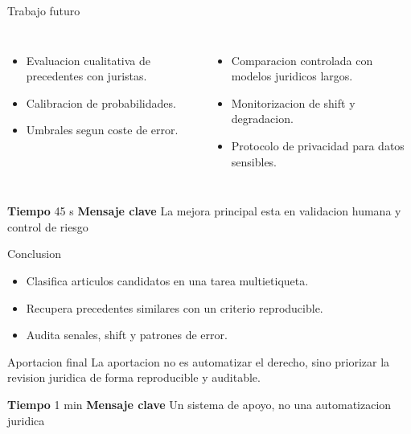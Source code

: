 \documentclass[aspectratio=169,10pt]{beamer}
\newcommand{\slidemeta}[2]{
  \vfill
  {\scriptsize\color{Muted}\textbf{Tiempo} #1 \hfill \textbf{Mensaje clave} #2}
}
\begin{document}
\begin{frame}{Trabajo futuro}
  \begin{columns}[T,onlytextwidth]
    \begin{itemize}
      \item Evaluacion cualitativa de precedentes con juristas.
      \item Calibracion de probabilidades.
      \item Umbrales segun coste de error.
    \end{itemize}
    \begin{itemize}
      \item Comparacion controlada con modelos juridicos largos.
      \item Monitorizacion de shift y degradacion.
      \item Protocolo de privacidad para datos sensibles.
    \end{itemize}
  \end{columns}
  \slidemeta{45 s}{La mejora principal esta en validacion humana y control de riesgo}
\end{frame}

\begin{frame}{Conclusion}
  \begin{itemize}
    \item Clasifica articulos candidatos en una tarea multietiqueta.
    \item Recupera precedentes similares con un criterio reproducible.
    \item Audita senales, shift y patrones de error.
  \end{itemize}
  \vspace{0.35cm}
  \begin{block}{Aportacion final}
    La aportacion no es automatizar el derecho, sino priorizar la revision juridica de forma reproducible y auditable.
  \end{block}
  \slidemeta{1 min}{Un sistema de apoyo, no una automatizacion juridica}
\end{frame}
\end{document}

